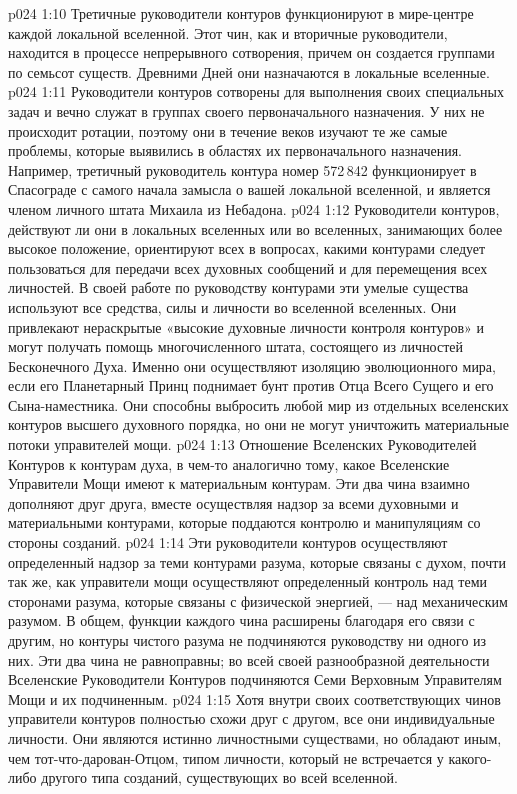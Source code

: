 \vs p024 1:10 Третичные руководители контуров функционируют в мире\hyp{}центре каждой локальной вселенной. Этот чин, как и вторичные руководители, находится в процессе непрерывного сотворения, причем он создается группами по семьсот существ. Древними Дней они назначаются в локальные вселенные.
\vs p024 1:11 Руководители контуров сотворены для выполнения своих специальных задач и вечно служат в группах своего первоначального назначения. У них не происходит ротации, поэтому они в течение веков изучают те же самые проблемы, которые выявились в областях их первоначального назначения. Например, третичный руководитель контура номер 572\,842 функционирует в Спасограде с самого начала замысла о вашей локальной вселенной, и является членом личного штата Михаила из Небадона.
\vs p024 1:12 \pc Руководители контуров, действуют ли они в локальных вселенных или во вселенных, занимающих более высокое положение, ориентируют всех в вопросах, какими контурами следует пользоваться для передачи всех духовных сообщений и для перемещения всех личностей. В своей работе по руководству контурами эти умелые существа используют все средства, силы и личности во вселенной вселенных. Они привлекают нераскрытые «высокие духовные личности контроля контуров» и могут получать помощь многочисленного штата, состоящего из личностей Бесконечного Духа. Именно они осуществляют изоляцию эволюционного мира, если его Планетарный Принц поднимает бунт против Отца Всего Сущего и его Сына\hyp{}наместника. Они способны выбросить любой мир из отдельных вселенских контуров высшего духовного порядка, но они не могут уничтожить материальные потоки управителей мощи.
\vs p024 1:13 \pc Отношение Вселенских Руководителей Контуров к контурам духа, в чем\hyp{}то аналогично тому, какое Вселенские Управители Мощи имеют к материальным контурам. Эти два чина взаимно дополняют друг друга, вместе осуществляя надзор за всеми духовными и материальными контурами, которые поддаются контролю и манипуляциям со стороны созданий.
\vs p024 1:14 Эти руководители контуров осуществляют определенный надзор за теми контурами разума, которые связаны с духом, почти так же, как управители мощи осуществляют определенный контроль над теми сторонами разума, которые связаны с физической энергией, --- над механическим разумом. В общем, функции каждого чина расширены благодаря его связи с другим, но контуры чистого разума не подчиняются руководству ни одного из них. Эти два чина не равноправны; во всей своей разнообразной деятельности Вселенские Руководители Контуров подчиняются Семи Верховным Управителям Мощи и их подчиненным.
\vs p024 1:15 \pc Хотя внутри своих соответствующих чинов управители контуров полностью схожи друг с другом, все они индивидуальные личности. Они являются истинно личностными существами, но обладают иным, чем тот\hyp{}что\hyp{}дарован\hyp{}Отцом, типом личности, который не встречается у какого\hyp{}либо другого типа созданий, существующих во всей вселенной.
